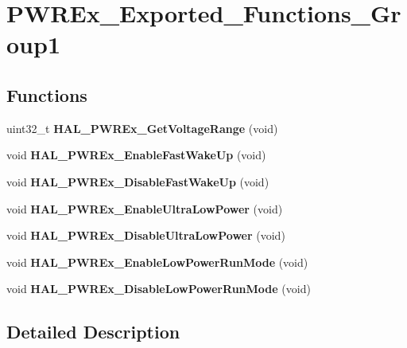 \hypertarget{group___p_w_r_ex___exported___functions___group1}{\section{P\-W\-R\-Ex\-\_\-\-Exported\-\_\-\-Functions\-\_\-\-Group1}
\label{group___p_w_r_ex___exported___functions___group1}
}
\subsection*{Functions}
\begin{DoxyCompactItemize}
\item 
\hypertarget{group___p_w_r_ex___exported___functions___group1_ga2978c7160c8d166f1bf2bf39e4bf33f7}{uint32\-\_\-t {\bfseries H\-A\-L\-\_\-\-P\-W\-R\-Ex\-\_\-\-Get\-Voltage\-Range} (void)}\label{group___p_w_r_ex___exported___functions___group1_ga2978c7160c8d166f1bf2bf39e4bf33f7}

\item 
\hypertarget{group___p_w_r_ex___exported___functions___group1_ga78afcb4f03c38dadb2a581ae0106499e}{void {\bfseries H\-A\-L\-\_\-\-P\-W\-R\-Ex\-\_\-\-Enable\-Fast\-Wake\-Up} (void)}\label{group___p_w_r_ex___exported___functions___group1_ga78afcb4f03c38dadb2a581ae0106499e}

\item 
\hypertarget{group___p_w_r_ex___exported___functions___group1_ga3a8db0be305c4b0161f4c7254ff130e2}{void {\bfseries H\-A\-L\-\_\-\-P\-W\-R\-Ex\-\_\-\-Disable\-Fast\-Wake\-Up} (void)}\label{group___p_w_r_ex___exported___functions___group1_ga3a8db0be305c4b0161f4c7254ff130e2}

\item 
\hypertarget{group___p_w_r_ex___exported___functions___group1_ga4334b6b788dbf1c9f22c4eff2e85c865}{void {\bfseries H\-A\-L\-\_\-\-P\-W\-R\-Ex\-\_\-\-Enable\-Ultra\-Low\-Power} (void)}\label{group___p_w_r_ex___exported___functions___group1_ga4334b6b788dbf1c9f22c4eff2e85c865}

\item 
\hypertarget{group___p_w_r_ex___exported___functions___group1_ga9444ebf6423de8b7aea0fe58bcbbdad9}{void {\bfseries H\-A\-L\-\_\-\-P\-W\-R\-Ex\-\_\-\-Disable\-Ultra\-Low\-Power} (void)}\label{group___p_w_r_ex___exported___functions___group1_ga9444ebf6423de8b7aea0fe58bcbbdad9}

\item 
\hypertarget{group___p_w_r_ex___exported___functions___group1_ga03d018969b6940092bb32a3869b8c84e}{void {\bfseries H\-A\-L\-\_\-\-P\-W\-R\-Ex\-\_\-\-Enable\-Low\-Power\-Run\-Mode} (void)}\label{group___p_w_r_ex___exported___functions___group1_ga03d018969b6940092bb32a3869b8c84e}

\item 
\hypertarget{group___p_w_r_ex___exported___functions___group1_gad34e84ab85766e6e5a29cf9ebce05883}{void {\bfseries H\-A\-L\-\_\-\-P\-W\-R\-Ex\-\_\-\-Disable\-Low\-Power\-Run\-Mode} (void)}\label{group___p_w_r_ex___exported___functions___group1_gad34e84ab85766e6e5a29cf9ebce05883}

\end{DoxyCompactItemize}


\subsection{Detailed Description}
